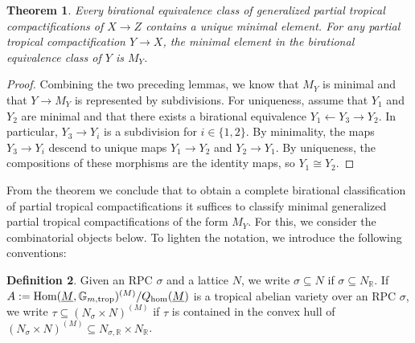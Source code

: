 \documentclass[11pt]{amsart}
\newtheorem{theorem}{Theorem}[section]
\theoremstyle{definition}
\newtheorem{definition}[theorem]{Definition}
\theoremstyle{remark}
\def\hom{\mathrm{hom}}
\def\trop{\mathrm{trop}}
\DeclareMathOperator{\Hom}{\textup{Hom}}
\begin{document}
\begin{theorem}
	\label{thm:pre_part_comp_descr}
	Every birational equivalence class of generalized partial tropical compactifications of $X\to Z$
	contains a unique minimal element. For any partial tropical compactification $Y\to X$,
	the minimal element in the birational equivalence class of $Y$ is $M_Y$.
\end{theorem}

\begin{proof}
	Combining the two preceding lemmas, we know that $M_Y$ is minimal and that $Y\to M_Y$ is represented
	by subdivisions. For uniqueness, assume that $Y_1$ and $Y_2$ are minimal and that there exists a birational
	equivalence $Y_1\leftarrow Y_3\rightarrow Y_2$. In particular, $Y_3\to Y_i$ is a subdivision for $i\in \{1,2\}$.
	By minimality, the maps $Y_3\to Y_i$ descend to unique maps $Y_1\to Y_2$ and $Y_2\to Y_1$. By uniqueness, the compositions
	of these morphisms are the identity maps, so $Y_1\cong Y_2$.
\end{proof}

From the theorem we conclude that to obtain a complete birational classification of partial tropical compactifications
it suffices to classify minimal generalized partial tropical compactifications of the form $M_Y$. For this,
we consider the combinatorial objects below. To lighten the notation, we introduce the following conventions:

\begin{definition}
	Given an RPC $\sigma$ and a lattice $N$, we write $\sigma\subseteq N$ if $\sigma\subseteq N_{\mathbb{R}}$.
	If $A:=\Hom(\underline{M},\mathbb{G}_{m,\trop})^{(M)}/Q_{\hom}(\underline{M})$ is a tropical abelian variety over an RPC $\sigma$,
	we write $\tau\subseteq (N_{\sigma}\times N)^{(M)}$ if $\tau$ is contained in the convex hull of
	$(N_{\sigma}\times N)^{(M)}\subseteq N_{\sigma,\mathbb{R}}\times N_{\mathbb{R}}$.
\end{definition}
\end{document}
